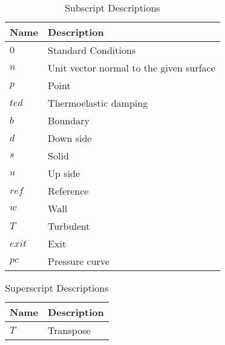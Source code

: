 \begin{table}[H]
\centering
\begin{tabularx}{\textwidth}{AB}
\toprule
\textbf{Name} & \textbf{Description} \\ 
\midrule
\( 0 \) & Standard Conditions \\ 
\( n \) & Unit vector normal to the given surface \\ 
\( p \) & Point \\ 
\( ted \) & Thermoelastic damping \\ 
\( b \) & Boundary \\ 
\( d \) & Down side \\ 
\( s \) & Solid \\ 
\( u \) & Up side \\ 
\( ref \) & Reference \\ 
\( w \) & Wall \\ 
\( T \) & Turbulent \\ 
\( exit \) & Exit \\ 
\( pc \) & Pressure curve \\ 
\bottomrule
\end{tabularx}
\caption{Subscript Descriptions}
\label{tab:subscripts}
\end{table}

\begin{table}[H]
\centering
\begin{tabularx}{\textwidth}{AB}
\toprule
\textbf{Name} & \textbf{Description} \\ 
\midrule
\( T \) & Transpose \\ 
\bottomrule
\end{tabularx}
\caption{Superscript Descriptions}
\label{tab:superscripts}
\end{table}